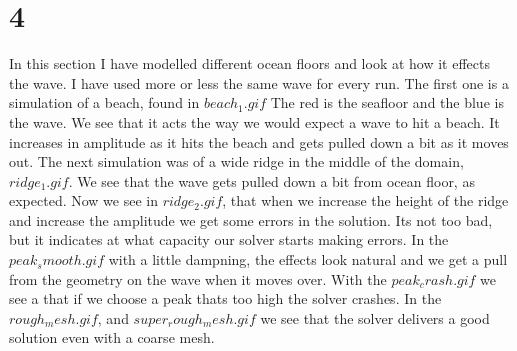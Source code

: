\documentclass[a4paper,norsk]{article}
\begin{document}
\section*{4}

In this section I have modelled different ocean floors and look at how it effects the wave. I have used more or less the same wave for every run.
The first one is a simulation of a beach, found in $beach_1.gif$  The red is the seafloor and the blue is the wave. We see that it acts the way we would expect a wave to hit a beach. It increases in amplitude as it hits the beach and gets pulled down a bit as it moves out.
The next simulation was of a wide ridge in the middle of the domain,$ ridge_1.gif$. We see that the wave gets pulled down a bit from ocean floor, as expected. Now we see in $ridge_2.gif$, that when we increase the height of the ridge and increase the amplitude we get some errors in the solution. Its not too bad, but it indicates at what capacity our solver starts making errors.
In the $peak_smooth.gif$ with a little dampning, the effects look natural and we get a pull from the geometry on the wave when it moves over.
With the $peak_crash.gif$ we see a that if we choose a peak thats too high the solver crashes.
In the $rough_mesh.gif$, and $super_rough_mesh.gif$ we see that the solver delivers a good solution even with a coarse mesh.
\end{document}
